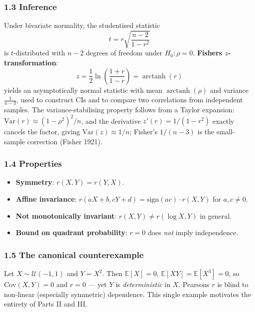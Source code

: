 \documentclass{article}
\providecommand{\tightlist}{\setlength{\itemsep}{0pt}\setlength{\parskip}{0pt}}
\begin{document}
\subsubsection{1.3 Inference}\label{13-inference}

Under bivariate normality, the studentised statistic \[
t = r \sqrt{\frac{n - 2}{1 - r^2}}
\] is \(t\)-distributed with \(n - 2\) degrees of freedom under
\(H_0: \rho = 0\). \textbf{Fisher\textquotesingle s
\(z\)-transformation}: \[
z = \frac{1}{2} \ln \left( \frac{1 + r}{1 - r} \right) = \operatorname{arctanh}(r)
\] yields an asymptotically normal statistic with mean
\(\operatorname{arctanh}(\rho)\) and variance \(\tfrac{1}{n - 3}\), used
to construct CIs and to compare two correlations from independent
samples. The variance-stabilising property follows from a Taylor
expansion: \(\mathrm{Var}(r) \approx (1 - \rho^2)^2 / n\), and the
derivative \(z'(r) = 1/(1 - r^2)\) exactly cancels the factor, giving
\(\mathrm{Var}(z) \approx 1/n\); Fisher's \(1/(n-3)\) is the small-sample
correction (Fisher 1921).

\subsubsection{1.4 Properties}\label{14-properties}

\begin{itemize}
\tightlist
\item
  \textbf{Symmetry}: \(r(X, Y) = r(Y, X)\).
\item
  \textbf{Affine invariance}:
  \(r(aX + b, cY + d) = \mathrm{sign}(ac) \cdot r(X, Y)\) for
  \(a, c \neq 0\).
\item
  \textbf{Not monotonically invariant}: \(r(X, Y) \neq r(\log X, Y)\) in
  general.
\item
  \textbf{Bound on quadrant probability}: \(r = 0\) does \emph{not}
  imply independence.
\end{itemize}

\subsubsection{1.5 The canonical
counterexample}\label{15-the-canonical-counterexample}

Let \(X \sim \mathcal{U}(-1, 1)\) and \(Y = X^2\). Then
\(\mathbb{E}[X] = 0\), \(\mathbb{E}[XY] = \mathbb{E}[X^3] = 0\), so
\(\mathrm{Cov}(X, Y) = 0\) and \(r = 0\) --- yet \(Y\) is
\emph{deterministic} in \(X\). Pearson\textquotesingle s \(r\) is blind
to non-linear (especially symmetric) dependence. This single example
motivates the entirety of Parts II and III.
\end{document}

